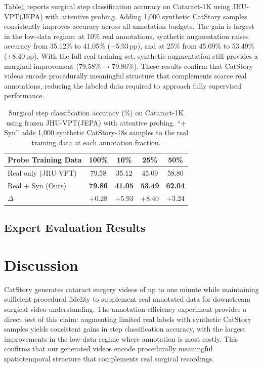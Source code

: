 \documentclass[runningheads]{llncs}
\begin{document}
Table\ref{tab:downstream} reports surgical step classification accuracy on Cataract-1K using JHU-VPT(JEPA) with attentive probing. Adding 1,000 synthetic CatStory samples consistently improves accuracy across all annotation budgets. The gain is largest in the low-data regime: at 10\% real annotations, synthetic augmentation raises accuracy from 35.12\% to 41.05\% (+5.93\,pp), and at 25\% from 45.09\% to 53.49\% (+8.40\,pp). With the full real training set, synthetic augmentation still provides a marginal improvement (79.58\%$\to$79.86\%). These results confirm that CatStory videos encode procedurally meaningful structure that complements scarce real annotations, reducing the labeled data required to approach fully supervised performance.

\begin{table}[t]
\centering
\caption{Surgical step classification accuracy (\%) on Cataract-1K using frozen JHU-VPT(JEPA) with attentive probing. ``+ Syn'' adds 1,000 synthetic CatStory-18s samples to the real training data at each annotation fraction.}
\label{tab:downstream}
\setlength{\tabcolsep}{6pt}
\renewcommand{\arraystretch}{1.15}
\begin{tabular}{lcccc}
\toprule
\textbf{Probe Training Data} & \textbf{100\%} & \textbf{10\%} & \textbf{25\%} & \textbf{50\%} \\
\midrule
Real only (JHU-VPT) & 79.58 & 35.12 & 45.09 & 58.80 \\
Real + Syn (Ours)    & \textbf{79.86} & \textbf{41.05} & \textbf{53.49} & \textbf{62.04} \\
\midrule
$\Delta$ & +0.28 & +5.93 & +8.40 & +3.24 \\
\bottomrule
\end{tabular}
\end{table}

\subsection{Expert Evaluation Results}


\section{Discussion}

CatStory generates cataract surgery videos of up to one minute while maintaining sufficient procedural fidelity to supplement real annotated data for downstream surgical video understanding. The annotation efficiency experiment provides a direct test of this claim: augmenting limited real labels with synthetic CatStory samples yields consistent gains in step classification accuracy, with the largest improvements in the low-data regime where annotation is most costly. This confirms that our generated videos encode procedurally meaningful spatiotemporal structure that complements real surgical recordings.
\end{document}
